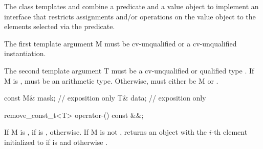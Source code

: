 

\pnum The class templates  and  combine a predicate and a value object to implement an interface that restricts assignments and/or operations on the value object to the elements selected via the predicate.

\pnum The first template argument \type M must be cv-unqualified \bool or a cv-unqualified \mask instantiation.

\pnum The second template argument \type T must be a cv-unqualified or \const qualified type .
If \type M is \bool,  must be an arithmetic type.
Otherwise,  must either be \type M or .

\begin{itemdecl}
const M& mask;  // exposition only
T& data;        // exposition only
\end{itemdecl}
\begin{itemdescr}
  \pnum{}

  \pnum{}
\end{itemdescr}

\begin{itemdecl}
remove_const_t<T> operator-() const &&;
\end{itemdecl}
\begin{itemdescr}
  \pnum\returns If \type M is \bool,  if  is \true,  otherwise.
  If \type M is not \bool, returns an object with the $i$-th element initialized to  if  is \true and  otherwise \foralli[M::].
\end{itemdescr}

